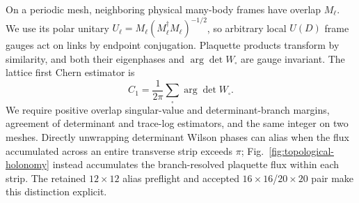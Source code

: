On a periodic mesh, neighboring physical many-body frames have overlap \(M_\ell\). We use its polar unitary \(U_\ell=M_\ell(M_\ell^\dagger M_\ell)^{-1/2}\), so arbitrary local \(U(D)\) frame gauges act on links by endpoint conjugation. Plaquette products transform by similarity, and both their eigenphases and \(\arg\det W_\square\) are gauge invariant. The lattice first Chern estimator is
\begin{equation}
 C_1=\frac{1}{2\pi}\sum_\square\arg\det W_\square.
 \label{eq:lattice-chern-v3}
\end{equation}
We require positive overlap singular-value and determinant-branch margins, agreement of determinant and trace-log estimators, and the same integer on two meshes. Directly unwrapping determinant Wilson phases can alias when the flux accumulated across an entire transverse strip exceeds \(\pi\); Fig.~\ref{fig:topological-holonomy} instead accumulates the branch-resolved plaquette flux within each strip. The retained \(12\times12\) alias preflight and accepted \(16\times16\)/\(20\times20\) pair make this distinction explicit.
